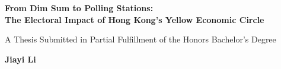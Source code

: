 \documentclass[letterpaper, 12pt]{article}
\begin{document}
\nocite{*}

\begin{titlepage}
\begin{center}
\LARGE
\textbf{From Dim Sum to Polling Stations: \\The Electoral Impact of Hong Kong's Yellow Economic Circle}
\end{center}

\begin{center}
\fontsize{14}{16}\selectfont
A Thesis Submitted in Partial Fulfillment of the Honors Bachelor's Degree \\

\vspace{0.1cm}

\textbf{Jiayi Li}\\


\end{center}


\end{titlepage}
\end{document}
